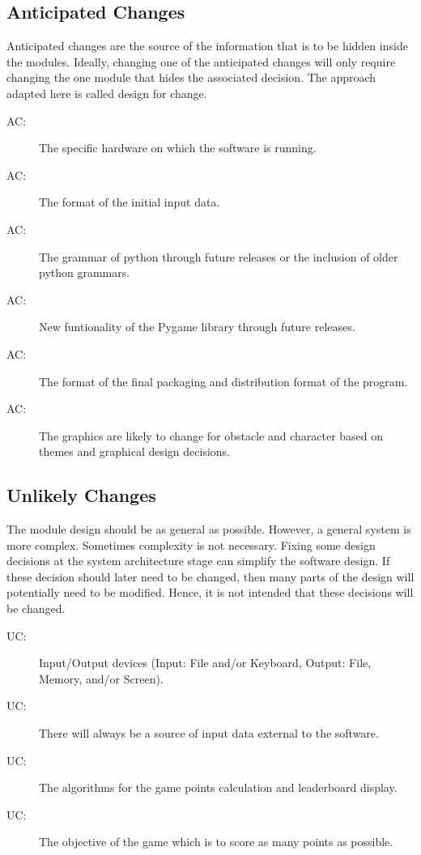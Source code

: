 \documentclass[12pt, titlepage]{article}
\newcounter{acnum}
\newcommand{\actheacnum}{AC\theacnum}
\newcounter{ucnum}
\newcommand{\uctheucnum}{UC\theucnum}
\begin{document}
\subsection{Anticipated Changes} \label{SecAchange}

Anticipated changes are the source of the information that is to be hidden
inside the modules. Ideally, changing one of the anticipated changes will only
require changing the one module that hides the associated decision. The approach
adapted here is called design for
change.

\begin{description}
\item[ \actheacnum \label{acHardware}:] The specific
  hardware on which the software is running.
\item[ \actheacnum \label{acInput}:] The format of the
  initial input data.
\item[ \actheacnum \label{acInput}:] The grammar of python through future releases or the inclusion of older python grammars.
\item[ \actheacnum \label{acInput}:] New funtionality of the Pygame library through future releases.
\item[ \actheacnum \label{acInput}:] The format of the final packaging and distribution format of
the program.
\item[ \actheacnum \label{acInput}:] The graphics are likely to change for obstacle and character based on themes and graphical design decisions. 
\end{description}

\subsection{Unlikely Changes} \label{SecUchange}

The module design should be as general as possible. However, a general system is
more complex. Sometimes complexity is not necessary. Fixing some design
decisions at the system architecture stage can simplify the software design. If
these decision should later need to be changed, then many parts of the design
will potentially need to be modified. Hence, it is not intended that these
decisions will be changed.

\begin{description}
\item[ \uctheucnum \label{ucIO}:] Input/Output devices
  (Input: File and/or Keyboard, Output: File, Memory, and/or Screen).
\item[ \uctheucnum \label{ucInput}:] There will always be
  a source of input data external to the software.
\item[ \uctheucnum \label{ucInput}:] The algorithms for the game points calculation and leaderboard display.
\item[ \uctheucnum \label{ucInput}:] The objective of the game which is to score as many points as possible. 
\end{description}
\end{document}
